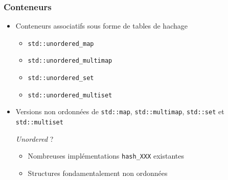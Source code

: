 \documentclass[C++.tex]{subfiles}
\begin{document}
\begin{frame}[fragile]
	\frametitle{Conteneurs}
	\begin{itemize}
		\item Conteneurs associatifs sous forme de tables de hachage
		\begin{itemize}
			\item \lstinline|std::unordered_map|
			\item \lstinline|std::unordered_multimap|
			\item \lstinline|std::unordered_set|
			\item \lstinline|std::unordered_multiset|
		\end{itemize}
		\item Versions non ordonnées de \lstinline|std::map|, \lstinline|std::multimap|, \lstinline|std::set| et \lstinline|std::multiset|

		\begin{block}{\textit{Unordered} ?}
			\begin{itemize}
				\item Nombreuses implémentations \lstinline|hash_XXX| existantes
				\item Structures fondamentalement non ordonnées
			\end{itemize}
		\end{block}
	\end{itemize}
\end{frame}
\end{document}
